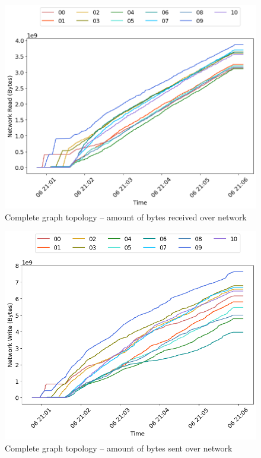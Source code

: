 \begin{minipage}{0.5\linewidth}
\begin{figure}[H]
\captionsetup{justification=centering,width=0.8\linewidth}
\includegraphics[width=\linewidth]{figures/graph-complete/net_read.png}
\caption{Complete graph topology -- amount of bytes received over network}
\label{fig:graph-complete-cpu_usage}
\end{figure}
\end{minipage}
\begin{minipage}{0.5\linewidth}
\begin{figure}[H]
\captionsetup{justification=centering,width=0.8\linewidth}
\includegraphics[width=\linewidth]{figures/graph-complete/net_write.png}
\caption{Complete graph topology -- amount of bytes sent over network}
\label{fig:graph-complete-mem_usage}
\end{figure}
\end{minipage}

